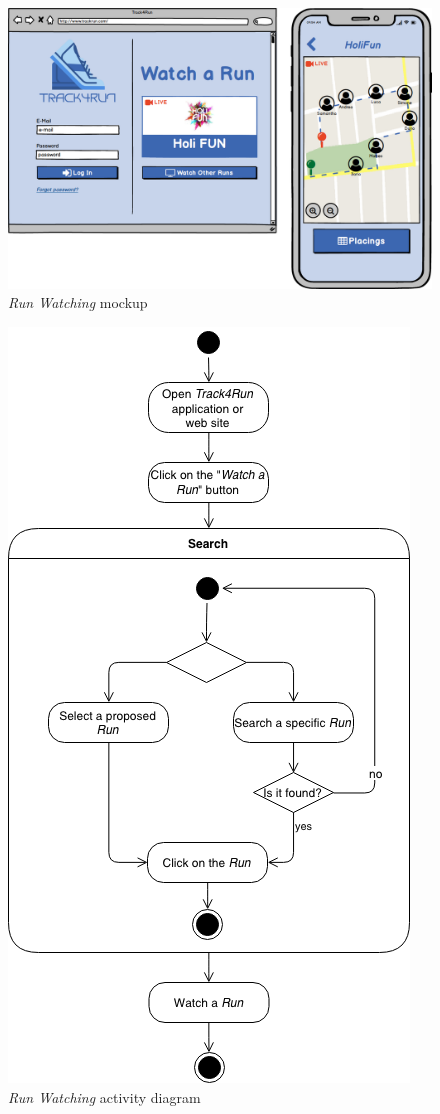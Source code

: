 \begin{figure}
\begin{center}
  \includegraphics[width=\textwidth]{img/mockup/VisitRun.png}
  \hspace{0.05\linewidth}
  \centering
  \caption{\textit{Run Watching} mockup}
  \label{img:runWatchingMockup}
\end{center}
\end{figure}

\begin{figure}
\begin{center}
  \includegraphics[height=0.6\paperheight]{img/activity/Watching.png}
  \hspace{0.05\linewidth}
  \centering
  \caption{\textit{Run Watching} activity diagram}
  \label{img:runWatchingActivityDiagram}
\end{center}
\end{figure}
